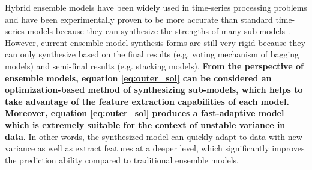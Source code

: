 Hybrid ensemble models have been widely used in time-series processing problems and have been experimentally proven to be more accurate than standard time-series models because they can synthesize the strengths of many sub-models \cite{ayitey2023forex}. However, current ensemble model synthesis forms are still very rigid because they can only synthesize based on the final results (e.g. voting mechanism of bagging models) and semi-final results (e.g. stacking models). \textbf{From the perspective of ensemble models, equation \ref{eq:outer_sol} can be considered an optimization-based method of synthesizing sub-models, which helps to take advantage of the feature extraction capabilities of each model. Moreover, equation \ref{eq:outer_sol} produces a fast-adaptive model which is extremely suitable for the context of unstable variance in data}. In other words, the synthesized model can quickly adapt to data with new variance as well as extract features at a deeper level, which significantly improves the prediction ability compared to traditional ensemble models.
